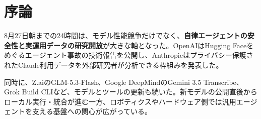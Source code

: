 \section*{序論}
8月27日朝までの24時間は、モデル性能競争だけでなく、\textbf{自律エージェントの安全性と実運用データの研究開放}が大きな軸となった。OpenAIはHugging Faceをめぐるエージェント事故の技術報告を公開し、Anthropicはプライバシー保護されたClaude利用データを外部研究者が分析できる枠組みを発表した。

同時に、Z.aiのGLM-5.3-Flash、Google DeepMindのGemini 3.5 Transcribe、Grok Build CLIなど、モデルとツールの更新も続いた。新モデルの公開直後からローカル実行・統合が進む一方、ロボティクスやハードウェア側では汎用エージェントを支える基盤への関心が広がっている。
